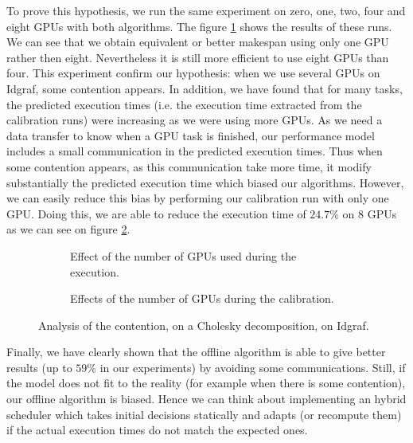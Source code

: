 \documentclass[10pt, conference, compsocconf,pdftex,dvipsnames]{IEEEtran}
\begin{document}
To prove this hypothesis, we run the same experiment on zero, one, two, four
and eight GPUs with both algorithms. The figure \ref{fig:ContentionGpu} shows
the results of these runs.  We can see that we obtain equivalent or better
makespan using only one GPU rather then eight.  Nevertheless it is still more
efficient to use eight GPUs than four. This experiment confirm our hypothesis:
when we use several GPUs on Idgraf, some contention appears. In addition, we
have found that for many tasks, the predicted execution times (i.e. the
execution time extracted from the calibration runs) were increasing as we were
using more GPUs. As we need a data transfer to know when a GPU task is
finished, our performance model includes a small communication in the
predicted execution times. Thus when some contention appears, as this
communication take more time, it modify substantially the predicted execution
time which biased our algorithms.  However, we can easily reduce this bias by
performing our calibration run with only one GPU.  Doing this, we are able to
reduce the execution time of $24.7\%$ on 8 GPUs as we can see on figure
\ref{fig:ContentionTrick}.

\begin{figure}[htb]
    \centering
    \begin{subfigure}{0.5\textwidth}
        \scalebox{0.65}{
            
        }
        \caption{Effect of the number of GPUs used during the execution.}
        \label{fig:ContentionGpu}
    \end{subfigure}
    \begin{subfigure}{0.5\textwidth}
        \scalebox{0.65}{
            
        }
        \caption{Effects of the number of GPUs during the calibration.}
        \label{fig:ContentionTrick}
    \end{subfigure}
    \caption{Analysis of the contention, on a 
    Cholesky decomposition, on Idgraf.}
    \label{fig:Contention}
\end{figure}

Finally, we have clearly shown that the offline algorithm is able to give
better results (up to $59\%$ in our experiments) by avoiding some
communications. Still, if the model does not fit to the reality (for example
when there is some contention), our offline algorithm is biased. Hence we can
think about implementing an hybrid scheduler which takes initial decisions
statically and adapts (or recompute them) if the actual execution times do not
match the expected ones.
\end{document}
